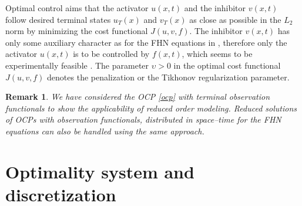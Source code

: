 \documentclass[preprint,12pt]{elsarticle}
\newtheorem{remark}[theorem]{Remark}
\begin{document}
Optimal control aims that the  activator $u(x,t)$ and the inhibitor $v(x,t)$ follow desired terminal states $u_T(x)$ and $v_T(x)$ as close as possible in the $L_2$ norm by minimizing the cost functional $J(u,v,f)$. The inhibitor $v(x,t)$ has only some auxiliary character as for the FHN equations in \cite{Casas13,Casas15soasa,Ryll16}, therefore only the activator $u(x,t)$  is to be controlled by $f(x,t)$, which seems to be experimentally feasible \cite{Vilas08}. The parameter $\upsilon> 0$ in the optimal cost functional $J(u,v,f)$ denotes the penalization or the Tikhonov regularization parameter.

\begin{remark}
We have considered the OCP \eqref{ocp} with terminal observation functionals to show the applicability of reduced order modeling. Reduced solutions of OCPs with observation functionals, distributed in space–time for the FHN equations \cite{Uzunca17} can also be handled using the same approach.
\end{remark}

\section{Optimality system and discretization}
\label{ocp_disc}
\end{document}

